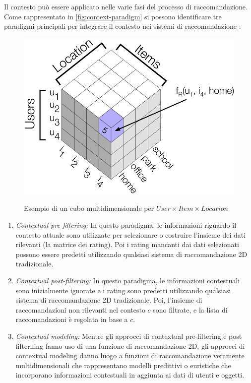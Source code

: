 Il contesto può essere applicato nelle varie fasi del processo di raccomandazione. Come rappresentato in \autoref{fig:context-paradigm} si possono identificare tre paradigmi principali per integrare il contesto nei sistemi di raccomandazione \cite{recsys-handbook}:

\begin{figure}
  \centering
  \includegraphics[scale=0.75]{immagini/rating_cube.png}
  \caption{Esempio di un cubo multidimensionale per $User \times Item \times Location$}
  \cite{survey-mattia}
  \label{fig:ratings-cube}
\end{figure}

\begin{enumerate}
 \item \textit{Contextual pre-filtering:} In questo paradigma, le informazioni riguardo il contesto attuale sono utilizzate per selezionare o costruire l'insieme dei dati rilevanti (la matrice dei rating). Poi i rating mancanti dai dati selezionati possono essere predetti utilizzando qualsiasi sistema di raccomandazione 2D tradizionale.
 \item \textit{Contextual post-filtering:} In questo paradigma, le informazioni contestuali sono inizialmente ignorate e i rating sono predetti utilizzando qualsiasi sistema di raccomandazione 2D tradizionale. Poi, l'insieme di raccomandazioni non rilevanti nel contesto $c$ sono filtrate, e la lista di raccomandazioni è regolata in base a $c$.
 \item  \textit{Contextual modeling:} Mentre gli approcci di contextual pre-filtering e post filterning fanno uso di una funzione di raccomandazione 2D, gli approcci di contextual modeling danno luogo a funzioni di raccomandazione veramente multidimensionali che rappresentano modelli predittivi o euristiche che incorporano informazioni contestuali in aggiunta ai dati di utenti e oggetti.
\end{enumerate}

